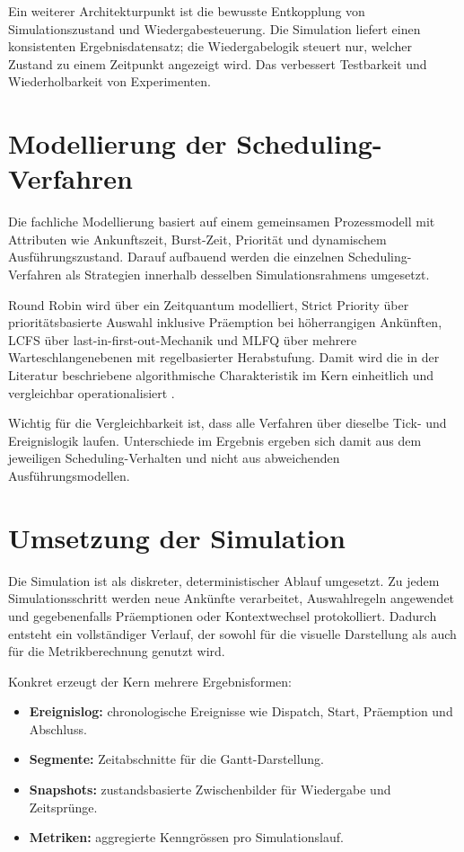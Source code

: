 Ein weiterer Architekturpunkt ist die bewusste Entkopplung von Simulationszustand und Wiedergabesteuerung. Die Simulation liefert einen konsistenten Ergebnisdatensatz; die Wiedergabelogik steuert nur, welcher Zustand zu einem Zeitpunkt angezeigt wird. Das verbessert Testbarkeit und Wiederholbarkeit von Experimenten.

\section{Modellierung der Scheduling-Verfahren}

Die fachliche Modellierung basiert auf einem gemeinsamen Prozessmodell mit Attributen wie Ankunftszeit, Burst-Zeit, Priorität und dynamischem Ausführungszustand. Darauf aufbauend werden die einzelnen Scheduling-Verfahren als Strategien innerhalb desselben Simulationsrahmens umgesetzt.

Round Robin wird über ein Zeitquantum modelliert, Strict Priority über prioritätsbasierte Auswahl inklusive Präemption bei höherrangigen Ankünften, LCFS über last-in-first-out-Mechanik und MLFQ über mehrere Warteschlangenebenen mit regelbasierter Herabstufung. Damit wird die in der Literatur beschriebene algorithmische Charakteristik im Kern einheitlich und vergleichbar operationalisiert \cite{silberschatz2018operating,tanenbaum2014modern,pinedo2016scheduling}.

Wichtig für die Vergleichbarkeit ist, dass alle Verfahren über dieselbe Tick- und Ereignislogik laufen. Unterschiede im Ergebnis ergeben sich damit aus dem jeweiligen Scheduling-Verhalten und nicht aus abweichenden Ausführungsmodellen.

\section{Umsetzung der Simulation}

Die Simulation ist als diskreter, deterministischer Ablauf umgesetzt. Zu jedem Simulationsschritt werden neue Ankünfte verarbeitet, Auswahlregeln angewendet und gegebenenfalls Präemptionen oder Kontextwechsel protokolliert. Dadurch entsteht ein vollständiger Verlauf, der sowohl für die visuelle Darstellung als auch für die Metrikberechnung genutzt wird.

Konkret erzeugt der Kern mehrere Ergebnisformen:

\begin{itemize}
  \item \textbf{Ereignislog:} chronologische Ereignisse wie Dispatch, Start, Präemption und Abschluss.
  \item \textbf{Segmente:} Zeitabschnitte für die Gantt-Darstellung.
  \item \textbf{Snapshots:} zustandsbasierte Zwischenbilder für Wiedergabe und Zeitsprünge.
  \item \textbf{Metriken:} aggregierte Kenngrössen pro Simulationslauf.
\end{itemize}

